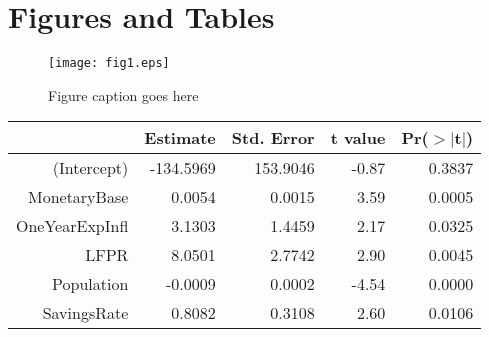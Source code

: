 \documentclass[12pt,english]{article}
\begin{document}
\section*{Figures and Tables}\label{sec:figTables}
\begin{figure}[ht]
\centering
\bigskip{}
\texttt{[image: fig1.eps]}
\caption{Figure caption goes here}
\label{fig:fig1}
\end{figure}


\caption{Summary Statistics of Variables of Interest}
\begin{table}[ht]
\centering
\begin{tabular}{rrrrr}
  \hline
 & Estimate & Std. Error & t value & Pr($>$$|$t$|$) \\ 
  \hline
(Intercept) & -134.5969 & 153.9046 & -0.87 & 0.3837 \\ 
  MonetaryBase & 0.0054 & 0.0015 & 3.59 & 0.0005 \\ 
  OneYearExpInfl & 3.1303 & 1.4459 & 2.17 & 0.0325 \\ 
  LFPR & 8.0501 & 2.7742 & 2.90 & 0.0045 \\ 
  Population & -0.0009 & 0.0002 & -4.54 & 0.0000 \\ 
  SavingsRate & 0.8082 & 0.3108 & 2.60 & 0.0106 \\ 
   \hline
\end{tabular}
\end{table}
\end{document}
